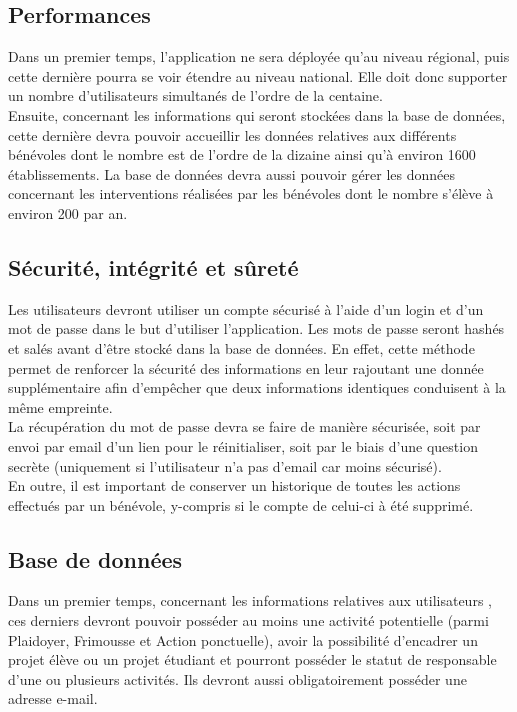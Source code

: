 \subsection{Performances}

Dans un premier temps, l'application ne sera déployée qu'au niveau régional, puis cette dernière pourra se voir étendre au niveau national. Elle doit donc supporter un nombre d'utilisateurs simultanés de l'ordre de la centaine. \\

Ensuite, concernant les informations qui seront stockées dans la base de données, cette dernière devra pouvoir accueillir les données relatives aux différents bénévoles dont le nombre est de l'ordre de la dizaine ainsi qu'à environ 1600 établissements. La base de données devra aussi pouvoir gérer les données concernant les interventions réalisées par les bénévoles dont le nombre s'élève à environ 200 par an.

\subsection{Sécurité, intégrité et sûreté}

Les utilisateurs devront utiliser un compte sécurisé à l'aide d'un login et d'un mot de passe dans le but d'utiliser l'application. Les mots de passe seront hashés et salés avant d'être stocké dans la base de données. En effet, cette méthode permet de renforcer la sécurité des informations en leur rajoutant une donnée supplémentaire afin d'empêcher que deux informations identiques conduisent à la même empreinte. \\

 La récupération du mot de passe devra se faire de manière sécurisée, soit par envoi par email d'un lien pour le réinitialiser, soit par le biais d'une question secrète (uniquement si l'utilisateur n'a pas d'email car moins sécurisé).\\

En outre, il est important de conserver un historique de toutes les actions effectués par un bénévole, y-compris si le compte de celui-ci à été supprimé. 

\subsection{Base de données}

Dans un premier temps, concernant les informations relatives aux utilisateurs , ces derniers devront pouvoir posséder au moins une activité potentielle (parmi Plaidoyer, Frimousse et Action ponctuelle), avoir la possibilité d'encadrer un projet élève ou un projet étudiant et pourront posséder le statut de responsable d'une ou plusieurs activités. Ils devront aussi obligatoirement posséder une adresse e-mail. \\

